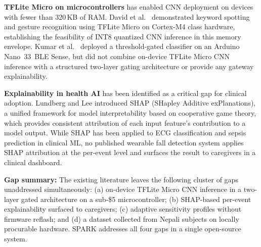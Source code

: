 \textbf{TFLite Micro on microcontrollers} has enabled CNN deployment on devices with fewer than 320\,KB of RAM. David et al.\ \cite{david2021tensorflow} demonstrated keyword spotting and gesture recognition using TFLite Micro on Cortex-M4 class hardware, establishing the feasibility of INT8 quantized CNN inference in this memory envelope. Kumar et al.\ \cite{kumar2022fall} deployed a threshold-gated classifier on an Arduino Nano~33~BLE Sense, but did not combine on-device TFLite Micro CNN inference with a structured two-layer gating architecture or provide any gateway explainability.

\textbf{Explainability in health AI} has been identified as a critical gap for clinical adoption. Lundberg and Lee \cite{lundberg2017shap} introduced SHAP (SHapley Additive exPlanations), a unified framework for model interpretability based on cooperative game theory, which provides consistent attribution of each input feature's contribution to a model output. While SHAP has been applied to ECG classification \cite{yao2021interpretation} and sepsis prediction in clinical ML, no published wearable fall detection system applies SHAP attribution at the per-event level and surfaces the result to caregivers in a clinical dashboard.

\textbf{Gap summary:} The existing literature leaves the following cluster of gaps unaddressed simultaneously: (a) on-device TFLite Micro CNN inference in a two-layer gated architecture on a sub-\$5 microcontroller; (b) SHAP-based per-event explainability surfaced to caregivers; (c) adaptive sensitivity profiles without firmware reflash; and (d) a dataset collected from Nepali subjects on locally procurable hardware. SPARK addresses all four gaps in a single open-source system.
